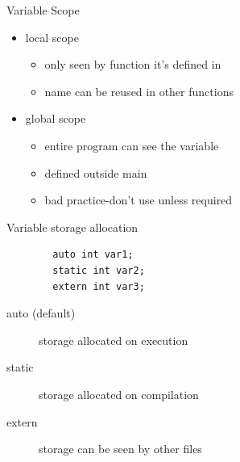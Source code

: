 \documentclass[xcolor={dvipsnames}]{beamer}
\begin{document}
\begin{frame}{Variable Scope}
	\begin{itemize}
		\item local scope
		\begin{itemize}
			\item only seen by function it's defined in
			\item name can be reused in other functions
		\end{itemize}
		\item global scope
		\begin{itemize}
			\item entire program can see the variable
			\item defined outside main
			\item bad practice-don't use unless required
		\end{itemize}
	\end{itemize}
\end{frame}

\begin{frame}[fragile]{Variable storage allocation}
	\begin{verbatim}
		auto int var1;
		static int var2;
		extern int var3;
	\end{verbatim}
	\begin{description}
		\item[auto (default)] storage allocated on execution
		\item[static] storage allocated on compilation
		\item[extern] storage can be seen by other files
	\end{description}
\end{frame}
\end{document}
